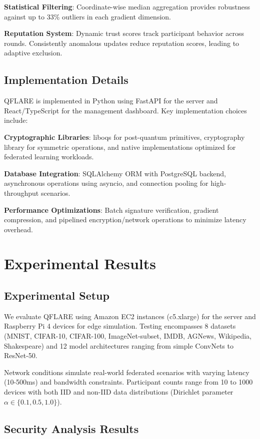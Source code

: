 \documentclass[conference]{IEEEtran}
\begin{document}
\textbf{Statistical Filtering}: Coordinate-wise median aggregation provides robustness against up to 33\% outliers in each gradient dimension.

\textbf{Reputation System}: Dynamic trust scores track participant behavior across rounds. Consistently anomalous updates reduce reputation scores, leading to adaptive exclusion.

\subsection{Implementation Details}

QFLARE is implemented in Python using FastAPI for the server and React/TypeScript for the management dashboard. Key implementation choices include:

\textbf{Cryptographic Libraries}: liboqs for post-quantum primitives, cryptography library for symmetric operations, and native implementations optimized for federated learning workloads.

\textbf{Database Integration}: SQLAlchemy ORM with PostgreSQL backend, asynchronous operations using asyncio, and connection pooling for high-throughput scenarios.

\textbf{Performance Optimizations}: Batch signature verification, gradient compression, and pipelined encryption/network operations to minimize latency overhead.

\section{Experimental Results}

\subsection{Experimental Setup}

We evaluate QFLARE using Amazon EC2 instances (c5.xlarge) for the server and Raspberry Pi 4 devices for edge simulation. Testing encompasses 8 datasets (MNIST, CIFAR-10, CIFAR-100, ImageNet-subset, IMDB, AGNews, Wikipedia, Shakespeare) and 12 model architectures ranging from simple ConvNets to ResNet-50.

Network conditions simulate real-world federated scenarios with varying latency (10-500ms) and bandwidth constraints. Participant counts range from 10 to 1000 devices with both IID and non-IID data distributions (Dirichlet parameter $\alpha \in \{0.1, 0.5, 1.0\}$).

\subsection{Security Analysis Results}
\end{document}

